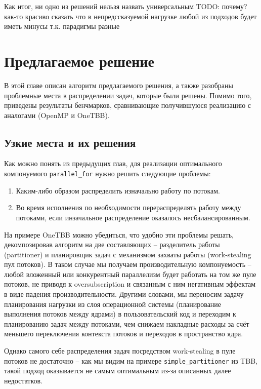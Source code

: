 \documentclass[times,specification,annotation]{itmo-student-thesis}
\begin{document}
Как итог, ни одно из решений нельзя назвать универсальным TODO: почему? как-то красиво сказать что в непредссказуемой нагрузке любой из подходов будет иметь минусы т.к. парадигмы разные

\chapter{Предлагаемое решение}
В этой главе описан алгоритм предлагаемого решения, а также разобраны проблемные места в распределении задач, которые были решены. Помимо того, приведены результаты бенчмарков, сравнивающие получившуюся реализацию с аналогами (OpenMP и OneTBB).

\section{Узкие места и их решения}
Как можно понять из предыдущих глав, для реализации оптимального компонуемого \texttt{parallel\_for} нужно решить следующие проблемы:
\begin{enumerate}
    \item Каким-либо образом распределить изначально работу по потокам.
    \item Во время исполнения по необходимости перераспределять работу между потоками, если инзачальное распределение оказалось несбалансированным.
\end{enumerate}

На примере OneTBB можно убедиться, что удобно эти проблемы решать, декомпозировав алгоритм на две составляющих -- разделитель работы (partitioner) и планировщик задач с механизмом захваты работы (work-stealing пул потоков). В таком случае мы получаем производительную компонуемость -- любой вложенный или конкурентный параллелизм будет работать на том же пуле потоков, не приводя к oversubscription и связанным с ним негативным эффектам в виде падения производительности. Другими словами, мы переносим задачу планирования нагрузки из слоя операционной системы (планирование выполнения потоков между ядрами) в пользовательский код и переходим к планированию задач между потоками, чем снижаем накладные расходы за счёт меньшего переключения контекста потоков и переходов в пространство ядра.

Однако самого себе распределения задач посредством work-stealing в пуле потоков не достаточно -- как мы видим на примере \texttt{simple\_partitioner} из TBB, такой подход оказывается не самым оптимальным из-за описанных далее недостатков.
\end{document}
